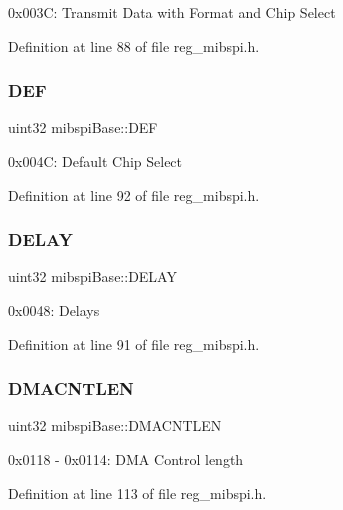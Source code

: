 0x003C\+: Transmit Data with Format and Chip Select 

Definition at line 88 of file reg\+\_\+mibspi.\+h.

\mbox{\label{structmibspiBase_ab75f602297b871a7bd36b64b6cc457e7}} 
\subsubsection{\texorpdfstring{D\+EF}{DEF}}
{\footnotesize\ttfamily uint32 mibspi\+Base\+::\+D\+EF}

0x004C\+: Default Chip Select 

Definition at line 92 of file reg\+\_\+mibspi.\+h.

\mbox{\label{structmibspiBase_a5774ae585bcd7150c88799df86b289cd}} 
\subsubsection{\texorpdfstring{D\+E\+L\+AY}{DELAY}}
{\footnotesize\ttfamily uint32 mibspi\+Base\+::\+D\+E\+L\+AY}

0x0048\+: Delays 

Definition at line 91 of file reg\+\_\+mibspi.\+h.

\mbox{\label{structmibspiBase_ad9412981fcaea75492a25f1f403d73b3}} 
\subsubsection{\texorpdfstring{D\+M\+A\+C\+N\+T\+L\+EN}{DMACNTLEN}}
{\footnotesize\ttfamily uint32 mibspi\+Base\+::\+D\+M\+A\+C\+N\+T\+L\+EN}

0x0118 -\/ 0x0114\+: D\+MA Control length 

Definition at line 113 of file reg\+\_\+mibspi.\+h.

\mbox{\label{structmibspiBase_ad8c8fd9f23925f0da5335153c15b769d}} 

